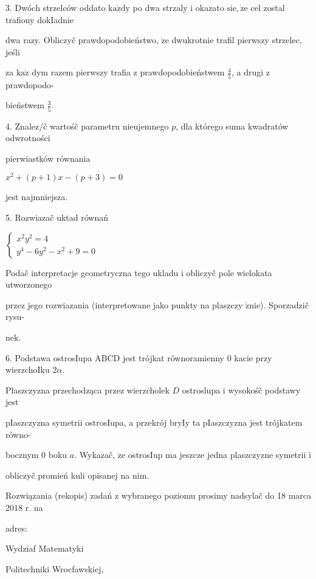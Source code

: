 \documentclass[a4paper,12pt]{article}
\begin{document}
3. Dwóch strzelców oddato $\mathrm{k}\mathrm{a}\dot{\mathrm{z}}\mathrm{d}\mathrm{y}$ po dwa strzaly $\mathrm{i}$ okazato $\mathrm{s}\mathrm{i}\mathrm{e}, \dot{\mathrm{z}}\mathrm{e}$ cel zostal trafiony dokIadnie

dwa razy. Obliczyč prawdopodobieństwo, $\dot{\mathrm{z}}\mathrm{e}$ dwukrotnie trafil pierwszy strzelec, jeśli

za $\mathrm{k}\mathrm{a}\dot{\mathrm{z}}$ dym razem pierwszy trafia $\mathrm{z}$ prawdopodobieństwem $\displaystyle \frac{4}{5}$, a drugi $\mathrm{z}$ prawdopodo-

bieństwem $\displaystyle \frac{3}{5}.$

4. Znalez/č wartośč parametru nieujemnego $p$, dla którego suma kwadratów odwrotności

pierwiastków równania

$x^{2}+(p+1)x-(p+3)=0$

jest najmniejsza.

5. Rozwiazač uktad równań

$\left\{\begin{array}{l}
x^{2}y^{2}=4\\
y^{4}-6y^{2}-x^{2}+9=0
\end{array}\right.$

Podač interpretacje geometryczna tego ukladu $\mathrm{i}$ obliczyč pole wielokata utworzonego

przez jego rozwiazania (interpretowane jako punkty na plaszczy $\acute{\mathrm{z}}\mathrm{n}\mathrm{i}\mathrm{e}$). Sporzadzič rysu-

nek.

6. Podstawa ostrosIupa ABCD jest trójkat równoramienny $0$ kacie przy wierzchoIku $2\alpha.$

Plaszczyzna przechodząca przez wierzcholek $D$ ostroslupa $\mathrm{i}$ wysokośč podstawy jest

pIaszczyzna symetrii ostrosIupa, a przekrój bryIy ta pIaszczyzna jest trójkatem równo-

bocznym $0$ boku $a$. Wykazač, $\dot{\mathrm{z}}\mathrm{e}$ ostrosIup ma jeszcze jedna plaszczyzne symetrii $\mathrm{i}$

obliczyč promień kuli opisanej na nim.

Rozwiązania (rekopis) zadań z wybranego poziomu prosimy nadsylač do 18 marca 2018 r. na

adres:

Wydziaf Matematyki

Politechniki Wrocfawskiej,
\end{document}
